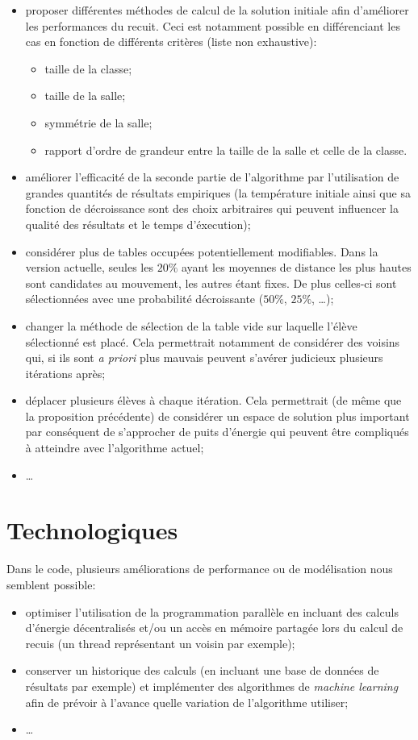 \documentclass[11pt,a4paper, openany]{book}
\begin{document}
\begin{itemize}
\item proposer différentes méthodes de calcul de la solution initiale afin d'améliorer les performances du recuit. Ceci est notamment possible en différenciant les cas en fonction de différents critères (liste non exhaustive):
\begin{itemize}
\item taille de la classe;
\item taille de la salle;
\item symmétrie de la salle;
\item rapport d'ordre de grandeur entre la taille de la salle et celle de la classe.
\end{itemize}
\item améliorer l'efficacité de la seconde partie de l'algorithme par l'utilisation de grandes quantités de résultats empiriques (la température initiale ainsi que sa fonction de décroissance sont des choix arbitraires qui peuvent influencer la qualité des résultats et le temps d'éxecution);
\item considérer plus de tables occupées potentiellement modifiables. Dans la version actuelle, seules les $20\%$ ayant les moyennes de distance les plus hautes sont candidates au mouvement, les autres étant fixes. De plus celles-ci sont sélectionnées avec une probabilité décroissante ($50\%$, $25\%$, \dots);
\item changer la méthode de sélection de la table vide sur laquelle l'élève sélectionné est placé. Cela permettrait notamment de considérer des voisins qui, si ils sont \textit{a priori} plus mauvais peuvent s'avérer judicieux plusieurs itérations après;
\item déplacer plusieurs élèves à chaque itération. Cela permettrait (de même que la proposition précédente) de considérer un espace de solution plus important par conséquent de s'approcher de puits d'énergie qui peuvent être compliqués à atteindre avec l'algorithme actuel;
\item \dots
\end{itemize}

\section{Technologiques}

Dans le code, plusieurs améliorations de performance ou de modélisation nous semblent possible:

\begin{itemize}
\item optimiser l'utilisation de la programmation parallèle en incluant des calculs d'énergie décentralisés et/ou un accès en mémoire partagée lors du calcul de recuis (un thread représentant un voisin par exemple);
\item conserver un historique des calculs (en incluant une base de données de résultats par exemple) et implémenter des algorithmes de \textit{machine learning} afin de prévoir à l'avance quelle variation de l'algorithme utiliser;
\item \dots
\end{itemize}
\end{document}
